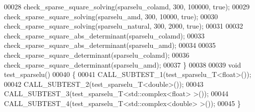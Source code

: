 \begin{DoxyCode}
00028   check\_sparse\_square\_solving(sparselu\_colamd,  300, 100000, \textcolor{keyword}{true}); 
00029   check\_sparse\_square\_solving(sparselu\_amd,     300,  10000, \textcolor{keyword}{true});
00030   check\_sparse\_square\_solving(sparselu\_natural, 300,   2000, \textcolor{keyword}{true});
00031   
00032   check\_sparse\_square\_abs\_determinant(sparselu\_colamd);
00033   check\_sparse\_square\_abs\_determinant(sparselu\_amd);
00034   
00035   check\_sparse\_square\_determinant(sparselu\_colamd);
00036   check\_sparse\_square\_determinant(sparselu\_amd);
00037 \}
00038 
00039 \textcolor{keywordtype}{void} test\_sparselu()
00040 \{
00041   CALL\_SUBTEST\_1(test\_sparselu\_T<float>()); 
00042   CALL\_SUBTEST\_2(test\_sparselu\_T<double>());
00043   CALL\_SUBTEST\_3(test\_sparselu\_T<std::complex<float> >()); 
00044   CALL\_SUBTEST\_4(test\_sparselu\_T<std::complex<double> >());
00045 \}
\end{DoxyCode}

